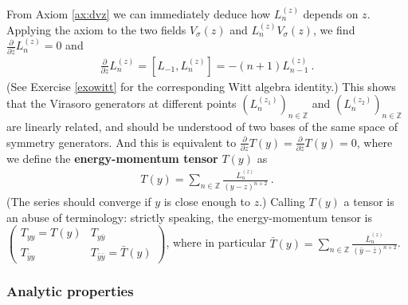 \documentclass[12pt, a4paper, notitlepage, twoside]{report}
\numberwithin{equation}{section}
\theoremstyle{break}
\begin{document}
From Axiom \ref{ax:dvz} we can immediately deduce how $L_n^{(z)}$ depends on $z$. Applying the axiom to the two fields $V_\sigma(z)$ and $L_n^{(z)}V_\sigma(z)$, we find $\frac{\partial}{\partial \bar z} L_n^{(z)}=0$ and 
\begin{align}
 \frac{\partial}{\partial z} L_n^{(z)} = [L_{-1},L_n^{(z)}] = -(n+1)L_{n-1}^{(z)}\ .
 \label{pll}
\end{align}
(See Exercise \ref{exowitt} for the corresponding Witt algebra identity.)
This shows that the Virasoro generators at different points $(L_n^{(z_1)})_{n\in \mathbb{Z}}$ and $(L_n^{(z_2)})_{n\in \mathbb{Z}}$ are linearly related, and should be understood of two bases of the same space of symmetry generators.
And this is equivalent to $\frac{\partial}{\partial z} T(y) = \frac{\partial}{\partial \bar z} T(y) = 0$, where we define the \textbf{\boldmath energy-momentum tensor} $T(y)$ as 
\begin{align}
 \boxed{T(y) = \sum_{n\in{\mathbb{Z}}} \frac{L_n^{(z)}}{(y-z)^{n+2}}}\ .
\label{tsl}
\end{align}
(The series should converge if $y$ is close enough to $z$.) Calling $T(y)$ a tensor is an abuse of terminology: strictly speaking, the energy-momentum tensor is
$\left(\begin{smallmatrix} T_{yy} = T(y) & T_{y\bar y} \\ T_{\bar y y} & T_{\bar y \bar y} = \bar T(y) \end{smallmatrix}\right)$, where in particular $\bar T(y)= \sum_{n\in{\mathbb{Z}}} \frac{\bar L_n^{(z)}}{(\bar y-\bar z)^{n+2}}$. 

\subsubsection{Analytic properties}
\end{document}
